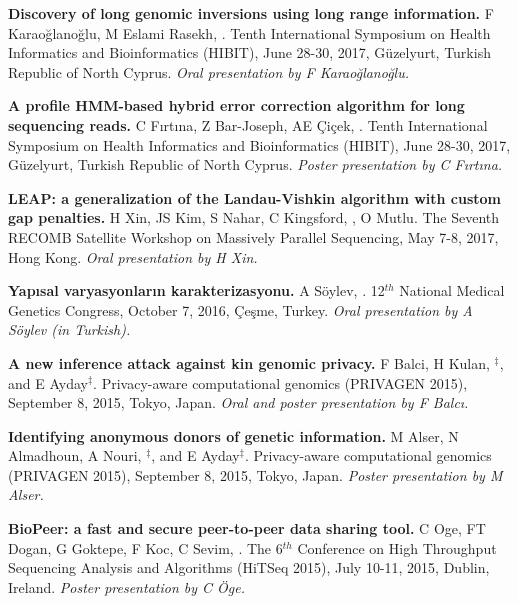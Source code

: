 \vspace{-.2cm}
       {\bf Discovery of long genomic inversions using long range information.} F Karaoğlanoğlu, M Eslami Rasekh, \calkan{}.
       Tenth International Symposium on Health Informatics and Bioinformatics (HIBIT), June 28-30, 2017, Güzelyurt, Turkish Republic of North Cyprus.
       {\it Oral presentation by F Karaoğlanoğlu.}

\vspace{-.2cm}
       {\bf A profile HMM-based hybrid error correction algorithm for long sequencing reads.} C Fırtına, Z Bar-Joseph, AE Çiçek, \calkan{}.
       Tenth International Symposium on Health Informatics and Bioinformatics (HIBIT), June 28-30, 2017, Güzelyurt, Turkish Republic of North Cyprus.
       {\it Poster presentation by C Fırtına.}

\vspace{-.2cm}
       {\bf LEAP: a generalization of the Landau-Vishkin algorithm with custom gap penalties.} H Xin, JS Kim, S Nahar, C Kingsford, \calkan{}, O Mutlu.
       The Seventh RECOMB Satellite Workshop on Massively Parallel Sequencing, May 7-8, 2017, Hong Kong.
       {\it Oral presentation by H Xin.}

\vspace{-.2cm}
       {\bf Yapısal varyasyonların karakterizasyonu.} A Söylev, \calkan{}. 12$^{th}$ National Medical Genetics Congress, October 7, 2016, Çeşme, Turkey.
       {\it Oral presentation by A Söylev (in Turkish).}
       
\vspace{-.2cm}
{\bf  A new inference attack against kin genomic privacy.}
F Balci, H Kulan, \calkan{}$^\ddag$, and E Ayday$^\ddag$. 
 Privacy-aware computational genomics (PRIVAGEN 2015), 
 September 8, 2015, Tokyo, Japan. {\it Oral and poster presentation by F Balcı.}

\vspace{-.2cm}
{\bf Identifying anonymous donors of genetic information.}
M Alser, N Almadhoun, A Nouri, \calkan{}$^\ddag$, and E Ayday$^\ddag$. 
 Privacy-aware computational genomics (PRIVAGEN 2015), 
 September 8, 2015, Tokyo, Japan. {\it Poster presentation by M Alser.}


\vspace{-.2cm}
 {\bf BioPeer: a fast and secure peer-to-peer data sharing tool.}
  C Oge, FT Dogan, G Goktepe, F Koc, C Sevim, \calkan{}.
 The 6$^{th}$ Conference on High Throughput Sequencing Analysis and Algorithms (HiTSeq 2015), 
July 10-11, 2015, Dublin, Ireland. {\it Poster presentation by C Öge.}

